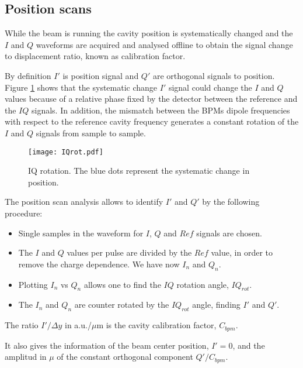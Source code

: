 \subsection{Position scans}
While the beam is running the cavity position is systematically changed and the $I$ and $Q$ waveforms are acquired and analysed offline to obtain the signal change to displacement ratio, known as calibration factor.\par
By definition $I'$ is position signal and $Q'$ are orthogonal signals to position. Figure \ref{f:IQrot} shows that the systematic change $I'$ signal could change the $I$ and $Q$ values because of a relative phase fixed by the detector between the reference and the $IQ$ signals. In addition, the mismatch between the BPMs dipole frequencies with respect to the reference cavity frequency generates a constant rotation of the $I$ and $Q$ signals from sample to sample.\par
\begin{figure}[htb]
 \centering%
 \texttt{[image: IQrot.pdf]}\caption{IQ rotation. The blue dots represent the systematic change in position.}\label{f:IQrot}
\end{figure}
The position scan analysis allows to identify $I'$ and $Q'$ by the following procedure:
\begin{itemize}
 \item Single samples in the waveform for $I$, $Q$ and $Ref$ signals are chosen.\par
 \item The $I$ and $Q$ values per pulse are divided by the $Ref$ value, in order to remove the charge dependence. We have now $I_n$ and $Q_n$.\par
 \item Plotting $I_n$ vs $Q_n$ allows one to find the $IQ$ rotation angle, $IQ_{rot}$.\par
 \item The $I_n$ and $Q_n$ are counter rotated by the $IQ_{rot}$ angle, finding $I'$ and $Q'$.
\end{itemize}
The ratio $I'/\Delta y$ in a.u./$\mu$m is the cavity calibration factor, $C_{bpm}$.\par
It also gives the information of the beam center position, $I'=0$, and the amplitud in $\mu$ of the constant orthogonal component $Q'/C_{bpm}$.\par
